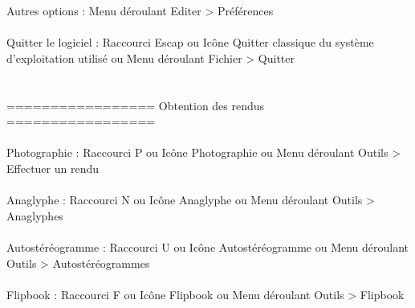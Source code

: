 Autres options :			Menu déroulant Editer > Préférences
\\ \\
Quitter le logiciel :			Raccourci Escap
	   	    			ou Icône Quitter classique du système d'exploitation utilisé
					ou Menu déroulant Fichier > Quitter
\\ \\ \\
================= Obtention des rendus =================
\\ \\
Photographie :	  	    	        Raccourci P
	     				ou     Icône Photographie
					ou     Menu déroulant Outils > Effectuer un rendu
\\ \\
Anaglyphe :	  	    	        Raccourci N
	     				ou     Icône Anaglyphe
					ou     Menu déroulant Outils > Anaglyphes
\\ \\
Autostéréogramme :	  	    	Raccourci U
	     				ou     Icône Autostéréogramme
					ou     Menu déroulant Outils > Autostéréogrammes
\\ \\
Flipbook :	  	    	        Raccourci F
	     				ou     Icône Flipbook
					ou     Menu déroulant Outils > Flipbook
